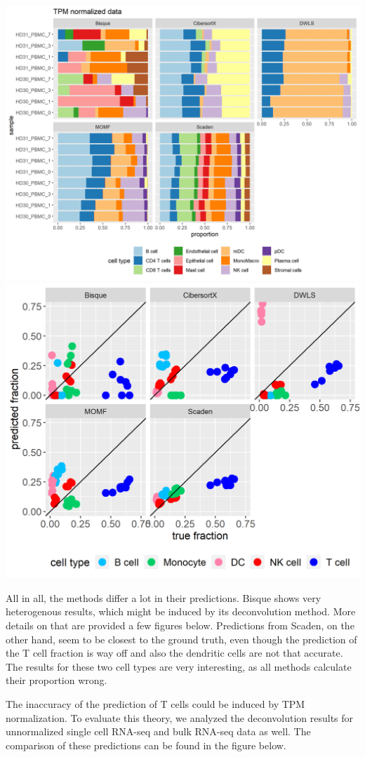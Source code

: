 \documentclass[
]{article}
\begin{document}
\includegraphics[width=0.8\linewidth]{images/propgrid_tpm}
\includegraphics[width=0.8\linewidth]{images/predictionVsGroundtruth}

All in all, the methods differ a lot in their predictions. Bisque shows
very heterogenous results, which might be induced by its deconvolution
method. More details on that are provided a few figures below.
Predictions from Scaden, on the other hand, seem to be closest to the
ground truth, even though the prediction of the T cell fraction is way
off and also the dendritic cells are not that accurate. The results for
these two cell types are very interesting, as all methods calculate
their proportion wrong.

The inaccuracy of the prediction of T cells could be induced by TPM
normalization. To evaluate this theory, we analyzed the deconvolution
results for unnormalized single cell RNA-seq and bulk RNA-seq data as
well. The comparison of these predictions can be found in the figure
below.
\end{document}
